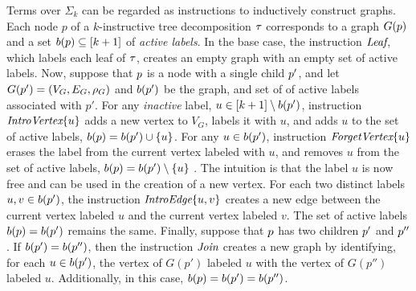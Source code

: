 Terms over $\Sigma_k$ can be regarded as instructions to inductively construct graphs. Each node $p$ of a $k$-instructive tree decomposition $\tau$ corresponds to a graph $G(p)$ and a set $b(p) \subseteq [k+1]$ of \emph{active labels}. In the base case, the instruction $\texttt{\it{Leaf}}$, which labels each leaf of $\tau$, creates an empty graph with an empty set of active labels. Now, suppose that $p$ is a node with a single child $p'$, and let 
$G(p') = (V_G,E_G,\rho_G)$ and $b(p')$ be the graph, and set of of active labels associated with $p'$. For any \textit{inactive} label, $u \in [k+1]\setminus b(p')$, instruction $\texttt{\it{IntroVertex}}\{u\}$ adds a new vertex to $V_G$, labels it with $u$, and adds $u$ to the set of active labels, $b(p) = b(p') \cup \{u\}$. For any $u \in b(p')$, instruction $\texttt{\it{ForgetVertex}}\{u\}$ erases the label from the current vertex labeled with $u$, and removes $u$ from the set of active labels, $b(p) = b(p') \setminus \{u\}$ . The intuition is that the label $u$ is now free and can be used in the creation of a new vertex. For each two distinct labels $u,v \in b(p')$, the instruction $\texttt{\it{IntroEdge}}\{u,v\}$ creates a new edge between the current vertex labeled $u$ and the current vertex labeled $v$. The set of active labels $b(p) = b(p')$ remains the same. 
Finally, suppose that $p$ has two children $p'$ and $p''$. If $b(p') = b(p'')$, then the instruction $\texttt{\it{Join}}$ creates a new graph by identifying, for each $u \in b(p')$, the vertex of $G(p')$ labeled $u$ with the vertex of $G(p'')$ labeled $u$. Additionally, in this case, $b(p) = b(p') = b(p'')$.

